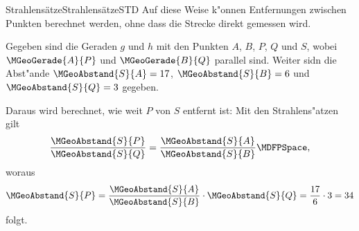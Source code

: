 \begin{MXContent}{Strahlens\"atze}{Strahlens\"atze}{STD}
Auf diese Weise k"onnen Entfernungen zwischen Punkten berechnet werden,
ohne dass die Strecke direkt gemessen wird.

\begin{MExample}
Gegeben sind die Geraden $g$ und $h$ mit den Punkten $A$, $B$, $P$, $Q$ und $S$,
wobei $\MGeoGerade{A}{P}$ und $\MGeoGerade{B}{Q}$ parallel sind. 
Weiter sidn die Abst"ande $\MGeoAbstand{S}{A} = 17$, $\MGeoAbstand{S}{B} = 6 $ 
und $\MGeoAbstand{S}{Q} = 3$ gegeben.
\par
Daraus wird berechnet, wie weit $P$ von $S$ entfernt ist:
Mit den Strahlens"atzen gilt
\[
   \frac{\MGeoAbstand{S}{P}}{\MGeoAbstand{S}{Q}}
 = \frac{\MGeoAbstand{S}{A}}{\MGeoAbstand{S}{B}} \MDFPSpace,
\]
woraus
\[
   \MGeoAbstand{S}{P}
 = \frac{\MGeoAbstand{S}{A}}{\MGeoAbstand{S}{B}} \cdot \MGeoAbstand{S}{Q} %
 = \frac{17}{6} \cdot 3 = 34
\]
folgt.
\end{MExample}
\end{MXContent}


